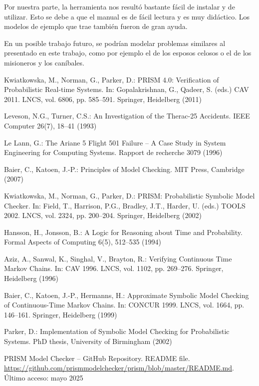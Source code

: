 \documentclass[runningheads]{llncs}
\begin{document}
Por nuestra parte, la herramienta nos resultó bastante fácil de instalar y de utilizar. Esto se debe a que el manual \cite{PRISMManual} es de fácil lectura y es muy didáctico. Los modelos de ejemplo que trae también fueron de gran ayuda.

En un posible trabajo futuro, se podrían modelar problemas similares al presentado en este trabajo, como por ejemplo el de los esposos celosos o el de los misioneros y los caníbales. \cite{Efimova2018}

\newpage

\begin{thebibliography}{8}

Kwiatkowska, M., Norman, G., Parker, D.: PRISM 4.0: Verification of Probabilistic Real-time Systems. In: Gopalakrishnan, G., Qadeer, S. (eds.) CAV 2011. LNCS, vol. 6806, pp. 585--591. Springer, Heidelberg (2011)

Leveson, N.G., Turner, C.S.: An Investigation of the Therac-25 Accidents. IEEE Computer 26(7), 18--41 (1993)

Le Lann, G.: The Ariane 5 Flight 501 Failure -- A Case Study in System Engineering for Computing Systems. Rapport de recherche 3079 (1996)

Baier, C., Katoen, J.-P.: Principles of Model Checking. MIT Press, Cambridge (2007)

Kwiatkowska, M., Norman, G., Parker, D.: PRISM: Probabilistic Symbolic Model Checker. In: Field, T., Harrison, P.G., Bradley, J.T., Harder, U. (eds.) TOOLS 2002. LNCS, vol. 2324, pp. 200--204. Springer, Heidelberg (2002)

Hansson, H., Jonsson, B.: A Logic for Reasoning about Time and Probability. Formal Aspects of Computing 6(5), 512--535 (1994)

Aziz, A., Sanwal, K., Singhal, V., Brayton, R.: Verifying Continuous Time Markov Chains. In: CAV 1996. LNCS, vol. 1102, pp. 269--276. Springer, Heidelberg (1996)

Baier, C., Katoen, J.-P., Hermanns, H.: Approximate Symbolic Model Checking of Continuous-Time Markov Chains. In: CONCUR 1999. LNCS, vol. 1664, pp. 146--161. Springer, Heidelberg (1999)

Parker, D.: Implementation of Symbolic Model Checking for Probabilistic Systems. PhD thesis, University of Birmingham (2002)

PRISM Model Checker – GitHub Repository. README file. \url{https://github.com/prismmodelchecker/prism/blob/master/README.md}. Último acceso: mayo 2025


\end{thebibliography}
\end{document}
